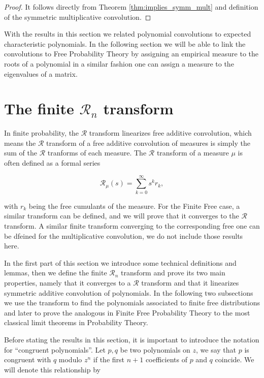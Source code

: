 \begin{proof}
    It follows directly from Theorem \ref{thm:implies_symm_mult} and definition of the symmetric multiplicative convolution.
\end{proof}

With the results in this section we related polynomial convolutions to expected characteristic polynomials. In the following section we will be able to link the convolutions to Free Probability Theory by assigning an empirical measure to the roots of a polynomial in a similar fashion one can assign a measure to the eigenvalues of a matrix.


\section{The finite \texorpdfstring{$\mathcal R_n$}{R} transform} 


In finite probability, the $\mathcal R$ transform linearizes free additive convolution, which means the $\mathcal R$ transform of a free additive convolution of measures is simply the sum of the $\mathcal R$ tranforms of each measure. The $\mathcal R$ transform of a measure $\mu$ is often defined as a formal series

\begin{equation*}
    \mathcal R_\mu(s) = \sum_{k=0}^\infty s^{k} r_k,
\end{equation*}

\noindent with $r_k$ being the free cumulants of the measure. For the Finite Free case, a similar transform can be defined, and we will prove that it converges to the $\mathcal R$ transform. A similar finite transform converging to the corresponding free one can be dfeined for the multiplicative convolution, we do not include those results here. 

In the first part of this section we introduce some technical definitions and lemmas, then we define the finite $\mathcal R_n$ transform and prove its two main properties, namely that it converges to a $\mathcal R$ transform and that it linearizes symmetric additive convolution of polynomials. In the following two subsections we use the transform to find the polynomials associated to finite free distributions and later to prove the analogous in Finite Free Probability Theory to the most classical limit theorems in Probability Theory.

Before stating the results in this section, it is important to introduce the notation for ``congruent polynomials''. Let $p,q$ be two polynomials on $z$, we say that $p$ is congruent with $q$ modulo $z^{n}$ if the first $n+1$ coefficients of $p$ and $q$ coincide. We will denote this relationship by

